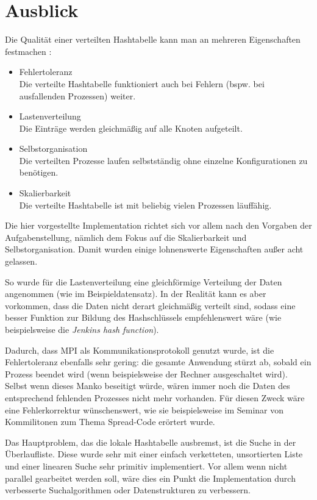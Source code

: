 \documentclass{scrreprt}
\begin{document}
\section{Ausblick}
Die Qualität einer verteilten Hashtabelle kann man an mehreren Eigenschaften festmachen%
:
\begin{itemize}
\item Fehlertoleranz\\
Die verteilte Hashtabelle funktioniert auch bei Fehlern (bspw. bei ausfallenden Prozessen) weiter.
\item Lastenverteilung\\
Die Einträge werden gleichmäßig auf alle Knoten aufgeteilt.
\item Selbstorganisation\\
Die verteilten Prozesse laufen selbstständig ohne einzelne Konfigurationen zu benötigen.
\item Skalierbarkeit\\
Die verteilte Hashtabelle ist mit beliebig vielen Prozessen läuffähig.
\end{itemize}

Die hier vorgestellte Implementation richtet sich vor allem nach den Vorgaben der Aufgabenstellung, nämlich dem Fokus auf die Skalierbarkeit und Selbstorganisation. Damit wurden einige lohnenswerte Eigenschaften außer acht gelassen. 

So wurde für die Lastenverteilung eine gleichförmige Verteilung der Daten angenommen (wie im Beispieldatensatz). In der Realität kann es aber vorkommen, dass die Daten nicht derart gleichmäßig verteilt sind, sodass eine besser Funktion zur Bildung des Hashschlüssels empfehlenswert wäre (wie beispielsweise die \emph{Jenkins hash function}).

Dadurch, dass MPI als Kommunikationsprotokoll genutzt wurde, ist die Fehlertoleranz ebenfalls sehr gering: die gesamte Anwendung stürzt ab, sobald ein Prozess beendet wird (wenn beispielsweise der Rechner ausgeschaltet wird). Selbst wenn dieses Manko beseitigt würde, wären immer noch die Daten des entsprechend fehlenden Prozesses nicht mehr vorhanden. Für diesen Zweck wäre eine Fehlerkorrektur wünschenswert, wie sie beispielsweise im Seminar von Kommilitonen zum Thema Spread-Code erörtert wurde.

Das Hauptproblem, das die lokale Hashtabelle ausbremst, ist die Suche in der Überlaufliste. Diese wurde sehr mit einer einfach verketteten, unsortierten Liste und einer linearen Suche sehr primitiv implementiert. Vor allem wenn nicht parallel gearbeitet werden soll, wäre dies ein Punkt die Implementation durch verbesserte Suchalgorithmen oder Datenstrukturen zu verbessern. 
\end{document}
